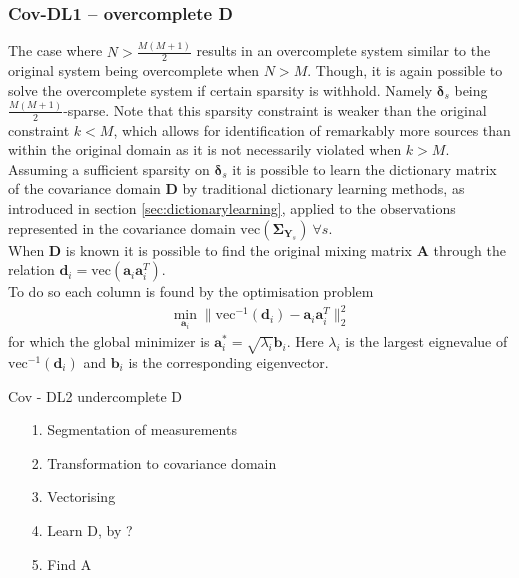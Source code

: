 \subsubsection*{Cov-DL1 -- overcomplete \textbf{D}}
The case where $N > \frac{M(M+1)}{2}$ results in an overcomplete system similar to the original system being overcomplete when $N>M$. 
Though, it is again possible to solve the overcomplete system if certain sparsity is withhold. Namely $\boldsymbol{\delta}_s$ being  $\frac{M(M+1)}{2}$-sparse. Note that this sparsity constraint is  weaker than the original constraint $k<M$, which allows for identification of remarkably more sources than within the original domain as it is not necessarily violated when $k>M$.
Assuming a sufficient sparsity on $\boldsymbol{\delta}_s$ it is possible to learn the dictionary matrix of the covariance domain $\textbf{D}$ by traditional dictionary learning methods, as introduced in section \ref{sec:dictionarylearning}, applied to the observations represented in the covariance domain $\text{vec}(\boldsymbol{\Sigma}_{\mathbf{Y}_s})\ \forall s$.\\
When $\textbf{D}$ is known it is possible to find the original mixing matrix $\textbf{A}$ through the relation $\textbf{d}_i=\text{vec}(\textbf{a}_i\textbf{a}_i^T)$.\\
To do so each column is found by the optimisation problem 
\begin{align*}
\min_{\textbf{a}_i} \| \text{vec}^{-1}(\textbf{d}_i) -\textbf{a}_i\textbf{a}_i^T\|_2^2  
\end{align*}
for which the global minimizer is $\textbf{a}^{\ast}_i=\sqrt{\lambda_i}\textbf{b}_i$. Here $\lambda_i$ is the largest eignevalue of $\text{vec}^{-1}(\textbf{d}_i)$ and $\textbf{b}_i$ is the corresponding eigenvector.
  
  
\begin{algorithm}[H]
\caption{Cov - DL2 undercomplete D}
\begin{itemize}
\item[1.] Segmentation of measurements 
\item[2.] Transformation to covariance domain
\item[3.] Vectorising 
\item[4.] Learn D, by ?
\item[5.] Find A
\end{itemize}
\end{algorithm}





